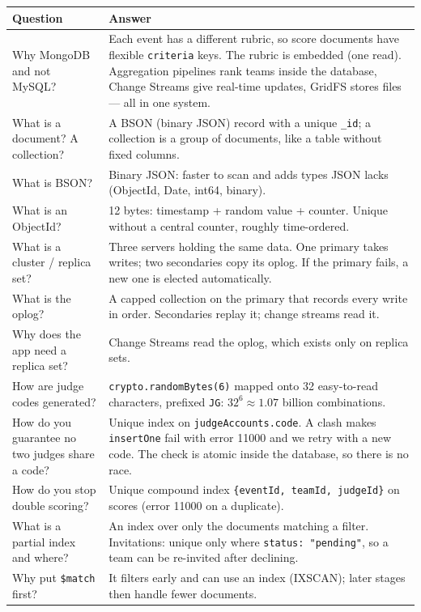\documentclass[11pt,a4paper]{article}
\newcommand{\op}[1]{\texttt{\$#1}}
\begin{document}
\begin{longtable}{@{}p{5.6cm}p{9.4cm}@{}}
\toprule
\textbf{Question} & \textbf{Answer}\\
\midrule
\endhead
Why MongoDB and not MySQL? & Each event has a different rubric, so score documents have flexible \texttt{criteria} keys. The rubric is embedded (one read). Aggregation pipelines rank teams inside the database, Change Streams give real-time updates, GridFS stores files --- all in one system. \\
What is a document? A collection? & A BSON (binary JSON) record with a unique \texttt{\_id}; a collection is a group of documents, like a table without fixed columns. \\
What is BSON? & Binary JSON: faster to scan and adds types JSON lacks (ObjectId, Date, int64, binary). \\
What is an ObjectId? & 12 bytes: timestamp + random value + counter. Unique without a central counter, roughly time-ordered. \\
What is a cluster / replica set? & Three servers holding the same data. One primary takes writes; two secondaries copy its oplog. If the primary fails, a new one is elected automatically. \\
What is the oplog? & A capped collection on the primary that records every write in order. Secondaries replay it; change streams read it. \\
Why does the app need a replica set? & Change Streams read the oplog, which exists only on replica sets. \\
How are judge codes generated? & \texttt{crypto.randomBytes(6)} mapped onto 32 easy-to-read characters, prefixed \texttt{JG}: $32^6 \approx 1.07$ billion combinations. \\
How do you guarantee no two judges share a code? & Unique index on \texttt{judgeAccounts.code}. A clash makes \texttt{insertOne} fail with error 11000 and we retry with a new code. The check is atomic inside the database, so there is no race. \\
How do you stop double scoring? & Unique compound index \texttt{\{eventId, teamId, judgeId\}} on scores (error 11000 on a duplicate). \\
What is a partial index and where? & An index over only the documents matching a filter. Invitations: unique only where \texttt{status: "pending"}, so a team can be re-invited after declining. \\
Why put \op{match} first? & It filters early and can use an index (IXSCAN); later stages then handle fewer documents. \\

\end{longtable}
\end{document}
